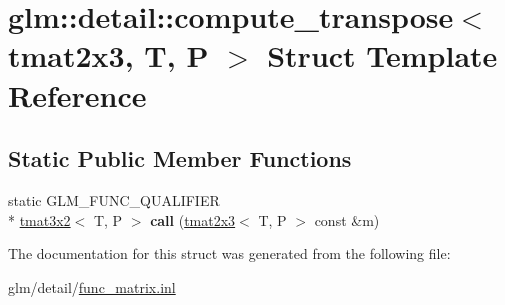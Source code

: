 \hypertarget{structglm_1_1detail_1_1compute__transpose_3_01tmat2x3_00_01T_00_01P_01_4}{\section{glm\-:\-:detail\-:\-:compute\-\_\-transpose$<$ tmat2x3, T, P $>$ Struct Template Reference}
\label{structglm_1_1detail_1_1compute__transpose_3_01tmat2x3_00_01T_00_01P_01_4}
}
\subsection*{Static Public Member Functions}
\begin{DoxyCompactItemize}
\item 
\hypertarget{structglm_1_1detail_1_1compute__transpose_3_01tmat2x3_00_01T_00_01P_01_4_a584c18e615e51a045c2fda8191f4c1b8}{static G\-L\-M\-\_\-\-F\-U\-N\-C\-\_\-\-Q\-U\-A\-L\-I\-F\-I\-E\-R \\*
\hyperlink{structglm_1_1tmat3x2}{tmat3x2}$<$ T, P $>$ {\bfseries call} (\hyperlink{structglm_1_1tmat2x3}{tmat2x3}$<$ T, P $>$ const \&m)}\label{structglm_1_1detail_1_1compute__transpose_3_01tmat2x3_00_01T_00_01P_01_4_a584c18e615e51a045c2fda8191f4c1b8}

\end{DoxyCompactItemize}


The documentation for this struct was generated from the following file\-:\begin{DoxyCompactItemize}
\item 
glm/detail/\hyperlink{func__matrix_8inl}{func\-\_\-matrix.\-inl}\end{DoxyCompactItemize}
